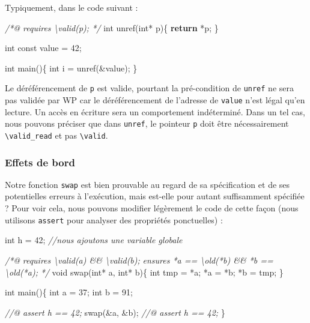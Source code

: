 \documentclass[12pt,francais,]{scrbook}
\newenvironment{Shaded}{}{}
\newcommand{\KeywordTok}[1]{\textcolor[rgb]{0.00,0.44,0.13}{\textbf{{#1}}}}
\newcommand{\DataTypeTok}[1]{\textcolor[rgb]{0.56,0.13,0.00}{{#1}}}
\newcommand{\DecValTok}[1]{\textcolor[rgb]{0.25,0.63,0.44}{{#1}}}
\newcommand{\CommentTok}[1]{\textcolor[rgb]{0.38,0.63,0.69}{\textit{{#1}}}}
\newcommand{\NormalTok}[1]{{#1}}
\begin{document}
Typiquement, dans le code suivant :

\begin{footnotesize}\begin{Shaded}
\begin{Highlighting}[]
\CommentTok{/*@ requires \textbackslash{}valid(p); */}
\DataTypeTok{int} \NormalTok{unref(}\DataTypeTok{int}\NormalTok{* p)\{}
  \KeywordTok{return} \NormalTok{*p;}
\NormalTok{\}}

\DataTypeTok{int} \DataTypeTok{const} \NormalTok{value = }\DecValTok{42}\NormalTok{;}

\DataTypeTok{int} \NormalTok{main()\{}
  \DataTypeTok{int} \NormalTok{i = unref(&value);}
\NormalTok{\}}
\end{Highlighting}
\end{Shaded}\end{footnotesize}

Le déréférencement de \texttt{p} est valide, pourtant la pré-condition
de \texttt{unref} ne sera pas validée par WP car le déréférencement de
l'adresse de \texttt{value} n'est légal qu'en lecture. Un accès en
écriture sera un comportement indéterminé. Dans un tel cas, nous pouvons
préciser que dans \texttt{unref}, le pointeur \texttt{p} doit être
nécessairement \texttt{\textbackslash{}valid\_read} et pas
\texttt{\textbackslash{}valid}.

\subsubsection{Effets de bord}\label{effets-de-bord}

Notre fonction \texttt{swap} est bien prouvable au regard de sa
spécification et de ses potentielles erreurs à l'exécution, mais
est-elle pour autant suffisamment spécifiée ? Pour voir cela, nous
pouvons modifier légèrement le code de cette façon (nous utilisons
\texttt{assert} pour analyser des propriétés ponctuelles) :

\begin{footnotesize}\begin{Shaded}
\begin{Highlighting}[]
\DataTypeTok{int} \NormalTok{h = }\DecValTok{42}\NormalTok{; }\CommentTok{//nous ajoutons une variable globale}

\CommentTok{/*@}
\CommentTok{  requires \textbackslash{}valid(a) && \textbackslash{}valid(b);}
\CommentTok{  ensures  *a == \textbackslash{}old(*b) && *b == \textbackslash{}old(*a);}
\CommentTok{*/}
\DataTypeTok{void} \NormalTok{swap(}\DataTypeTok{int}\NormalTok{* a, }\DataTypeTok{int}\NormalTok{* b)\{}
  \DataTypeTok{int} \NormalTok{tmp = *a;}
  \NormalTok{*a = *b;}
  \NormalTok{*b = tmp;}
\NormalTok{\}}

\DataTypeTok{int} \NormalTok{main()\{}
  \DataTypeTok{int} \NormalTok{a = }\DecValTok{37}\NormalTok{;}
  \DataTypeTok{int} \NormalTok{b = }\DecValTok{91}\NormalTok{;}

  \CommentTok{//@ assert h == 42;}
  \NormalTok{swap(&a, &b);}
  \CommentTok{//@ assert h == 42;}
\NormalTok{\}}
\end{Highlighting}
\end{Shaded}\end{footnotesize}
\end{document}
